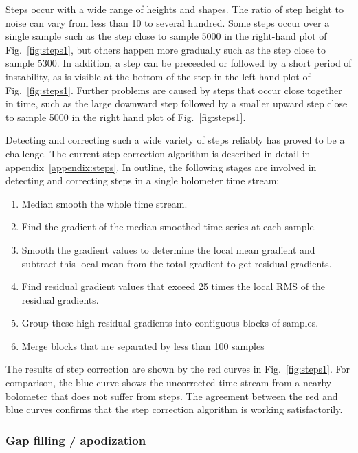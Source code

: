 \documentclass[useAMS,usenatbib,nofootinbib]{mn2e}
\begin{document}
Steps occur with a wide range of heights and shapes. The ratio of step
height to noise can vary from less than 10 to several hundred. Some steps
occur over a single sample such as the step close to sample 5000 in the
right-hand plot of Fig.~\ref{fig:steps1}, but others happen more
gradually such as the step close to sample 5300. In addition, a step can
be preceeded or followed by a short period of instability, as is visible
at the bottom of the step in the left hand plot of
Fig.~\ref{fig:steps1}. Further problems are caused by steps that occur
close together in time, such as the large downward step followed by a
smaller upward step close to sample 5000 in the right hand plot of
Fig.~\ref{fig:steps1}.

Detecting and correcting such a wide variety of steps reliably has proved
to be a challenge. The current step-correction algorithm is described in
detail in appendix~\ref{appendix:steps}. In outline, the following stages
are involved in detecting and correcting steps in a single bolometer time
stream:

\begin{enumerate}

\item Median smooth the whole time stream.
\item Find the gradient of the median smoothed time series at each sample.
\item Smooth the gradient values to determine the local mean gradient and
subtract this local mean from the total gradient to get residual gradients.
\item Find residual gradient values that exceed 25 times the local RMS of
the residual gradients.
\item Group these high residual gradients into contiguous blocks of
samples.
\item Merge blocks that are separated by less than 100 samples

\end{enumerate}

The results of step correction are shown by the red curves in
Fig.~\ref{fig:steps1}. For comparison, the blue curve shows the
uncorrected time stream from a nearby bolometer that does not suffer from
steps. The agreement between the red and blue curves confirms that
the step correction algorithm is working satisfactorily.


\subsubsection{Gap filling / apodization}
\label{sec:gaps}
\end{document}
